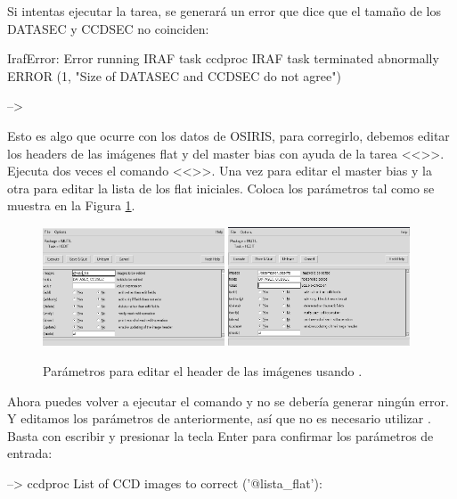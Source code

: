 Si intentas ejecutar la tarea, se generará un error que dice que el tamaño de los DATASEC y CCDSEC no coinciden:
\begin{shell}
IrafError: Error running IRAF task ccdproc
IRAF task terminated abnormally
ERROR (1, "Size of DATASEC and CCDSEC do not agree")

--> 
\end{shell}

Esto es algo que ocurre con los datos de OSIRIS, para corregirlo, debemos editar los headers de las imágenes flat y del master bias con ayuda de la tarea <<>>. Ejecuta dos veces el comando <<>>. Una vez para editar el master bias y la otra para editar la lista de los flat iniciales. Coloca los parámetros tal como se muestra en la Figura \ref{fig:pyraf-hedit-flat}.

\begin{figure}[htb]
  \centering
	\includegraphics[width=0.48\textwidth]{figures/pyraf-hedit-flat.png}
	\includegraphics[width=0.48\textwidth]{figures/pyraf-hedit-master-bias.png}
	\caption{Parámetros para editar el header de las imágenes usando .}
	\label{fig:pyraf-hedit-flat} 
\end{figure}

Ahora puedes volver a ejecutar el comando  y no se debería generar ningún error. Y editamos los parámetros de  anteriormente, así que no es necesario utilizar . Basta con escribir  y presionar la tecla Enter para confirmar los parámetros de entrada:

\begin{shell}
--> ccdproc
List of CCD images to correct ('@lista_flat'): 


\end{shell}


